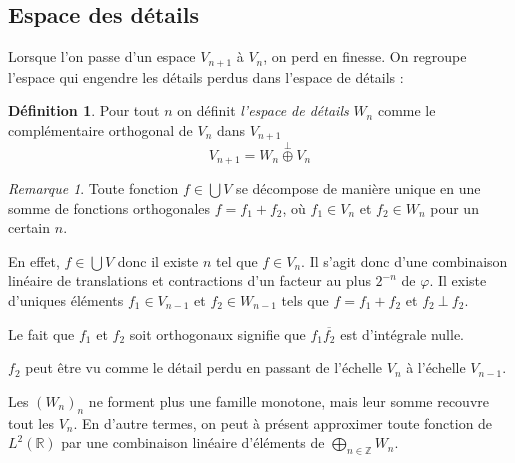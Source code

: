 \documentclass[]{article}
\theoremstyle{remark}
\newtheorem{myrem}{Remarque}
\theoremstyle{definition}
\newtheorem{mydef}{Définition}
\newcommand{\DS}{\displaystyle}
\begin{document}
	\subsection{Espace des détails}
	
	Lorsque l'on passe d'un espace $V_{n+1}$ à $V_{n}$, on perd en finesse. On regroupe l'espace qui engendre les détails perdus dans l'espace de détails :
	
	\begin{mydef}
		Pour tout $n$ on définit \textit{l'espace de détails} $W_{n}$ comme le complémentaire orthogonal de $V_{n}$ dans $V_{n+1}$ $$V_{n+1} = W_n \stackrel{\perp}{\oplus} V_n$$
	\end{mydef}
	
	\begin{myrem}
		Toute fonction $f \in \bigcup V$ se décompose de manière unique en une somme de fonctions orthogonales $f = f_1 + f_2$, où $f_1 \in V_{n}$ et $f_2 \in W_n$ pour un certain $n$.
		
		En effet, $f \in \bigcup V$ donc il existe $n$ tel que $f \in V_n$. Il s'agit donc d'une combinaison linéaire de translations et contractions d'un facteur au plus $2^{-n}$ de $\varphi$. Il existe d'uniques éléments $f_1 \in V_{n-1}$ et $f_2 \in W_{n-1}$ tels que $f = f_1 + f_2$ et $f_2 ~ \bot ~ f_2$.
		
		Le fait que $f_1$ et $f_2$ soit orthogonaux signifie que $f_1 \overline{f_2}$ est d'intégrale nulle.
		
		$f_2$ peut être vu comme le détail perdu en passant de l'échelle $V_n$ à l'échelle $V_{n-1}$.
	\end{myrem}
	
	Les $(W_n)_n$ ne forment plus une famille monotone, mais leur somme recouvre tout les $V_n$. En d'autre termes, on peut à présent approximer toute fonction de $L^2(\mathbb{R})$ par une combinaison linéaire d'éléments de $\DS \bigoplus_{n \in \mathbb{Z}} W_n$.
	
\end{document}
